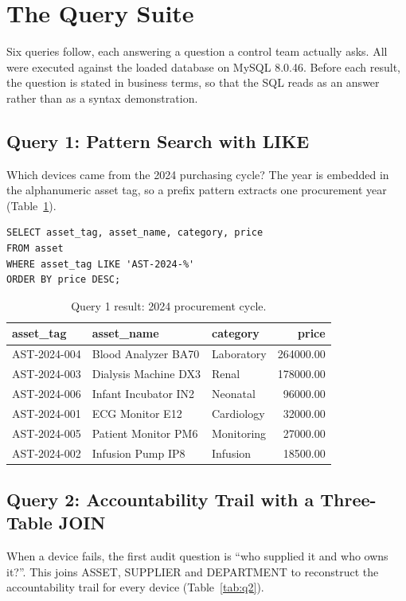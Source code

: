 \documentclass[conference]{IEEEtran}
\begin{document}
\section{The Query Suite}\label{sec:queries}
Six queries follow, each answering a question a control team actually asks.
All were executed against the loaded database on MySQL 8.0.46. Before each
result, the question is stated in business terms, so that the SQL reads as an
answer rather than as a syntax demonstration.

\subsection{Query 1: Pattern Search with LIKE}
Which devices came from the 2024 purchasing cycle? The year is embedded in
the alphanumeric asset tag, so a prefix pattern extracts one procurement
year (Table~\ref{tab:q1}).

\begin{lstlisting}[style=sqlstyle]
SELECT asset_tag, asset_name, category, price
FROM asset
WHERE asset_tag LIKE 'AST-2024-%'
ORDER BY price DESC;
\end{lstlisting}

\begin{table}[!t]
  \caption{Query 1 result: 2024 procurement cycle.}
  \label{tab:q1}
  \centering
  \footnotesize
  \begin{tabular}{lllr}
    \toprule
    asset\_tag & asset\_name & category & price \\
    \midrule
    AST-2024-004 & Blood Analyzer BA70 & Laboratory & 264000.00 \\
    AST-2024-003 & Dialysis Machine DX3 & Renal & 178000.00 \\
    AST-2024-006 & Infant Incubator IN2 & Neonatal & 96000.00 \\
    AST-2024-001 & ECG Monitor E12 & Cardiology & 32000.00 \\
    AST-2024-005 & Patient Monitor PM6 & Monitoring & 27000.00 \\
    AST-2024-002 & Infusion Pump IP8 & Infusion & 18500.00 \\
    \bottomrule
  \end{tabular}
\end{table}

\subsection{Query 2: Accountability Trail with a Three-Table JOIN}\label{sec:q2}
When a device fails, the first audit question is ``who supplied it and who
owns it?''. This joins ASSET, SUPPLIER and DEPARTMENT to reconstruct the
accountability trail for every device (Table~\ref{tab:q2}).
\end{document}
